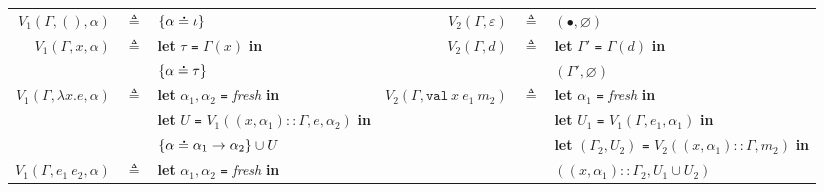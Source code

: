\documentclass{article}
\theoremstyle{definition}
\newcommand*{\cons}{::}
\newcommand*{\A}[1]{\overset{\,_{\mbox{\Large .}}}{#1}}
\newcommand*{\modid}{d}
\newcommand*{\Lete}{\mathtt{val}}
\begin{document}
\begin{flushright}\end{flushright}
\hspace{-2.5em}
\begin{tabular}{rclrcl}
	$V_1(\Gamma,(),\alpha)$              & $\triangleq$ & $\{\alpha\A{=}\iota\}$                                                            & $V_2(\Gamma,\varepsilon)$             & $\triangleq$ & $(\bullet,\varnothing)$                                                                      \\
	$V_1(\Gamma,x,\alpha)$               & $\triangleq$ & \textbf{let} $\tau$ \texttt{=} $\Gamma(x)$ \textbf{in}                            & $V_2(\Gamma,\modid)$                  & $\triangleq$ & \textbf{let} $\Gamma'$ \texttt{=} $\Gamma(d)$ \textbf{in}                                    \\
	                                     &              & $\{\alpha\A{=}\tau\}$                                                             &                                       &              & $(\Gamma',\varnothing)$                                                                      \\
	$V_1(\Gamma,\lambda x.e,\alpha)$     & $\triangleq$ & \textbf{let} $\alpha_1,\alpha_2$ \texttt{=} \textit{fresh} \textbf{in}            & $V_2(\Gamma,\Lete\:x\:e_1\:m_2)$      & $\triangleq$ & \textbf{let} $\alpha_1$ \texttt{=} \textit{fresh} \textbf{in}                                \\
	                                     &              & \textbf{let} $U$ \texttt{=} $V_1((x,\alpha_1)\cons\Gamma,e,\alpha_2)$ \textbf{in} &                                       &              & \textbf{let} $U_1$ \texttt{=} $V_1(\Gamma,e_1,\alpha_1)$ \textbf{in}                         \\
	                                     &              & $\{\alpha\A{=}\alpha_1\rightarrow\alpha_2\}\cup U$                                &                                       &              & \textbf{let} $(\Gamma_2,U_2)$ \texttt{=} $V_2((x,\alpha_1)\cons\Gamma,m_2)$ \textbf{in}      \\
	$V_1(\Gamma,e_1\:e_2,\alpha)$        & $\triangleq$ & \textbf{let} $\alpha_1,\alpha_2$ \texttt{=} \textit{fresh} \textbf{in}            &                                       &              & $((x,\alpha_1)\cons\Gamma_2,U_1\cup U_2)$                                                    \\

\end{tabular}
\end{document}
